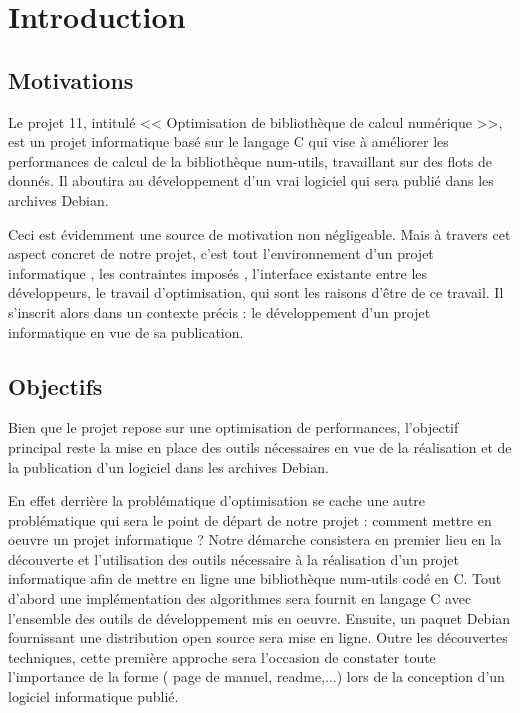\chapter{Introduction}
\label{chap:introduction}

\section{Motivations }

Le projet 11\citep{projet11}, intitul\'e << Optimisation de biblioth\`eque de calcul num\'erique >>, est un projet informatique bas\'e sur le langage C qui vise \`a am\'eliorer 
les performances de calcul de la biblioth\`eque num-utils\citep{numutils}, travaillant sur des flots de donn\'es\citep{dataflux}.
Il aboutira au d\'eveloppement d'un vrai logiciel qui sera publi\'e dans les archives Debian\citep{debian}.

Ceci est \'evidemment une source de motivation non n\'egligeable. Mais \`a travers cet aspect concret de notre projet, c'est tout l'environnement d'un 
projet informatique , les contraintes impos\'es , l'interface existante entre les d\'eveloppeurs, le travail d'optimisation, qui sont les raisons 
d'\^etre de ce travail.
Il s'inscrit alors dans un contexte pr\'ecis : le d\'eveloppement d'un projet informatique en vue de sa publication.

\section{Objectifs}

Bien que le projet repose sur une optimisation de performances, l'objectif principal reste la mise en place des outils n\'ecessaires en vue de la 
r\'ealisation et de la publication d'un logiciel dans les archives Debian.  

En effet derri\`ere la probl\'ematique d'optimisation se cache une autre probl\'ematique qui sera le point de d\'epart de notre projet : comment mettre
 en oeuvre un projet informatique ? 
Notre d\'emarche consistera en premier lieu en la d\'ecouverte et l'utilisation des outils n\'ecessaire \`a la r\'ealisation d'un projet informatique afin 
de mettre en ligne une biblioth\`eque num-utils cod\'e en C.
\newline 	
Tout d'abord une impl\'ementation des algorithmes sera fournit en langage C avec l'ensemble des outils de d\'eveloppement mis en oeuvre. Ensuite, 
un paquet Debian fournissant une distribution open source sera mise en ligne. 
Outre les d\'ecouvertes techniques, cette premi\`ere approche sera l'occasion de constater toute l'importance de la forme ( page de manuel, readme,...) 
lors de la conception d'un logiciel informatique publi\'e.

